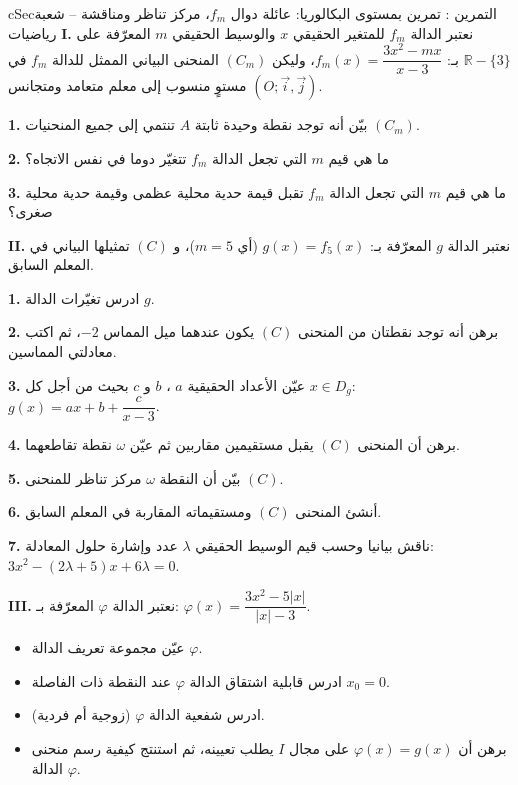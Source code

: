 \documentclass[12pt,a4paper]{article}
\newenvironment{BOX}[2]{\begin{otherlanguage}{english}\begin{arbox}{#1}{#2}}{\end{arbox}\end{otherlanguage}}
\newcounter{exo}
\newenvironment{tamrin}[1]{\stepcounter{exo}\begin{BOX}{cSec}{التمرين \theexo: #1}}{\end{BOX}}
\newcommand{\R}{\mathbb{R}}
\newcommand{\QQ}[1]{\par\smallskip\textbf{#1.} }
\begin{document}
\begin{tamrin}{تمرين بمستوى البكالوريا: عائلة دوال $f_m$، مركز تناظر ومناقشة -- شعبة رياضيات}
\textbf{I.} نعتبر الدالة $f_m$ للمتغير الحقيقي $x$ والوسيط الحقيقي $m$ المعرّفة على $\R-\{3\}$ بـ: $f_m(x)=\dfrac{3x^{2}-mx}{x-3}$، وليكن $(C_m)$ المنحنى البياني الممثل للدالة $f_m$ في مستوٍ منسوب إلى معلم متعامد ومتجانس $(O;\vec i,\vec j)$.
\QQ{1} بيّن أنه توجد نقطة وحيدة ثابتة $A$ تنتمي إلى جميع المنحنيات $(C_m)$.
\QQ{2} ما هي قيم $m$ التي تجعل الدالة $f_m$ تتغيّر دوما في نفس الاتجاه؟
\QQ{3} ما هي قيم $m$ التي تجعل الدالة $f_m$ تقبل قيمة حدية محلية عظمى وقيمة حدية محلية صغرى؟

\textbf{II.} نعتبر الدالة $g$ المعرّفة بـ: $g(x)=f_5(x)$ (أي $m=5$)، و $(C)$ تمثيلها البياني في المعلم السابق.
\QQ{1} ادرس تغيّرات الدالة $g$.
\QQ{2} برهن أنه توجد نقطتان من المنحنى $(C)$ يكون عندهما ميل المماس $-2$، ثم اكتب معادلتي المماسين.
\QQ{3} عيّن الأعداد الحقيقية $a$ ، $b$ و $c$ بحيث من أجل كل $x\in D_g$: \ $g(x)=ax+b+\dfrac{c}{x-3}$.
\QQ{4} برهن أن المنحنى $(C)$ يقبل مستقيمين مقاربين ثم عيّن $\omega$ نقطة تقاطعهما.
\QQ{5} بيّن أن النقطة $\omega$ مركز تناظر للمنحنى $(C)$.
\QQ{6} أنشئ المنحنى $(C)$ ومستقيماته المقاربة في المعلم السابق.
\QQ{7} ناقش بيانيا وحسب قيم الوسيط الحقيقي $\lambda$ عدد وإشارة حلول المعادلة: \ $3x^{2}-(2\lambda+5)x+6\lambda=0$.

\textbf{III.} نعتبر الدالة $\varphi$ المعرّفة بـ: $\varphi(x)=\dfrac{3x^{2}-5|x|}{|x|-3}$.
\begin{itemize}[label=$\clubsuit$]
\item عيّن مجموعة تعريف الدالة $\varphi$.
\item ادرس قابلية اشتقاق الدالة $\varphi$ عند النقطة ذات الفاصلة $x_0=0$.
\item ادرس شفعية الدالة $\varphi$ (زوجية أم فردية).
\item برهن أن $\varphi(x)=g(x)$ على مجال $I$ يطلب تعيينه، ثم استنتج كيفية رسم منحنى الدالة $\varphi$.
\end{itemize}
\end{tamrin}
\end{document}

